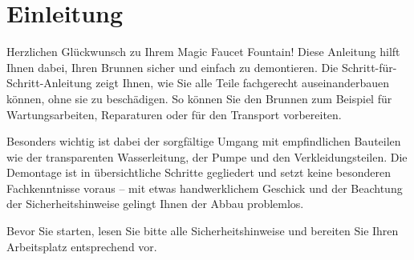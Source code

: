 %
%
%

\chapter{Einleitung}
Herzlichen Glückwunsch zu Ihrem Magic Faucet Fountain! Diese Anleitung hilft Ihnen dabei, Ihren Brunnen sicher und einfach zu demontieren. Die Schritt-für-Schritt-Anleitung zeigt Ihnen, wie Sie alle Teile fachgerecht auseinanderbauen können, ohne sie zu beschädigen. So können Sie den Brunnen zum Beispiel für Wartungsarbeiten, Reparaturen oder für den Transport vorbereiten.

Besonders wichtig ist dabei der sorgfältige Umgang mit empfindlichen Bauteilen wie der transparenten Wasserleitung, der Pumpe und den Verkleidungsteilen. Die Demontage ist in übersichtliche Schritte gegliedert und setzt keine besonderen Fachkenntnisse voraus – mit etwas handwerklichem Geschick und der Beachtung der Sicherheitshinweise gelingt Ihnen der Abbau problemlos.

Bevor Sie starten, lesen Sie bitte alle Sicherheitshinweise und bereiten Sie Ihren Arbeitsplatz entsprechend vor.



